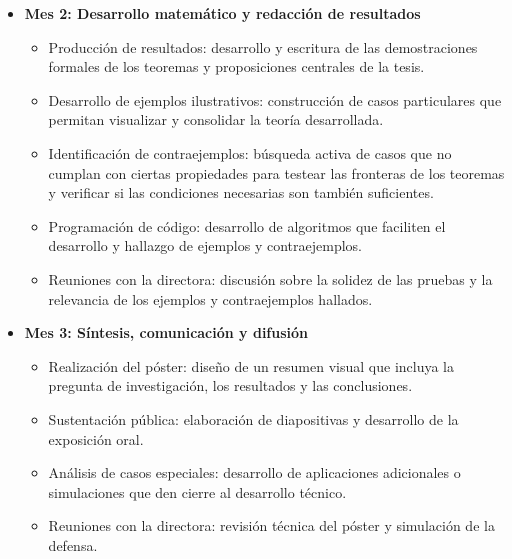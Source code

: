\documentclass{article}
\begin{document}
\begin{itemize}
\begin{itemize}
\begin{itemize}
                   \item Redacción de preliminares: escritura en \LaTeX\ de los conceptos básicos, definiciones técnicas y notación que se utilizarán a lo largo del trabajo.
                   \item Consolidación del marco teórico: redacción de la introducción y el contexto histórico del tema de estudio.
                \end{itemize}
             \item \textbf{Mes 2: Desarrollo matemático y redacción de resultados}
                \begin{itemize}
                   \item Producción de resultados: desarrollo y escritura de las demostraciones formales de los teoremas y proposiciones centrales de la tesis.
                   \item Desarrollo de ejemplos ilustrativos: construcción de casos particulares que permitan visualizar y consolidar la teoría desarrollada.
                   \item Identificación de contraejemplos: búsqueda activa de casos que no cumplan con ciertas propiedades para testear las fronteras de los teoremas y verificar si las condiciones necesarias son también suficientes.
                   \item Programación de código: desarrollo de algoritmos que faciliten el desarrollo y hallazgo de ejemplos y contraejemplos.
                   \item Reuniones con la directora: discusión sobre la solidez de las pruebas y la relevancia de los ejemplos y contraejemplos hallados.
                \end{itemize}
             \item \textbf{Mes 3: Síntesis, comunicación y difusión}
                \begin{itemize}
                   \item Realización del póster: diseño de un resumen visual que incluya la pregunta de investigación, los resultados y las conclusiones.
                   \item Sustentación pública: elaboración de diapositivas y desarrollo de la exposición oral.
                   \item Análisis de casos especiales: desarrollo de aplicaciones adicionales o simulaciones que den cierre al desarrollo técnico.
                   \item Reuniones con la directora: revisión técnica del póster y simulación de la defensa.

\end{itemize}
\end{itemize}
\end{itemize}
\end{document}

